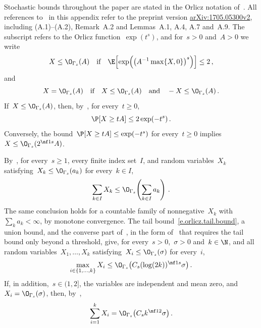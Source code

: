\documentclass[11pt]{amsart}
\begin{document}
Stochastic bounds throughout the paper are stated in the Orlicz notation of~\citet[Appendix~A]{AKMBook}. All references to~\citet[Appendix~A]{AKMBook} in this appendix refer to the preprint version \href{https://arxiv.org/abs/1705.05300v2}{arXiv:1705.05300v2}, including (A.1)--(A.2), Remark~A.2 and Lemmas~A.1, A.4, A.7 and~A.9. The subscript refers to the Orlicz function~$\exp(t^s)$, and for~$s>0$ and~$A>0$ we write
\begin{equation*}
	X\leq\O_{\Gamma_s}(A)
	\quad\text{if}\quad
	\E\!\left[\exp\!\left(\left(A^{-1}\max\{X,0\}\right)^s\right)\right]\leq2\,,
\end{equation*}
and
\begin{equation}
	X=\O_{\Gamma_s}(A)
	\quad\text{if}\quad
	X\leq\O_{\Gamma_s}(A)
	\quad\text{and}\quad
	-X\leq\O_{\Gamma_s}(A)\,.
	\label{e.orlicz.two.sided.definition}
\end{equation}
If~$X\leq\O_{\Gamma_s}(A)$, then, by~\citet[Lemma~A.1]{AKMBook}, for every~$t\geq0$,
\begin{equation}
	\P[X\geq tA]\leq2\exp(-t^s)\,.
	\label{e.orlicz.tail.bound}
\end{equation}
Conversely, the bound~$\P[X\geq tA]\leq\exp(-t^s)$ for every~$t\geq0$ implies~$X\leq\O_{\Gamma_s}(2^{\nf1s}A)$.

\smallskip

By~\citet[Lemma~A.4]{AKMBook}, for every~$s\geq1$, every finite index set~$I$, and random variables~$X_k$ satisfying~$X_k\leq\O_{\Gamma_s}(a_k)$ for every~$k\in I$,
\begin{equation}
	\sum_{k\in I}X_k
	\leq
	\O_{\Gamma_s}\!\left(\sum_{k\in I}a_k\right)\,.
	\label{e.orlicz.triangle.inequality}
\end{equation}
The same conclusion holds for a countable family of nonnegative~$X_k$ with~$\sum_k a_k<\infty$, by monotone convergence. The tail bound~\eqref{e.orlicz.tail.bound}, a union bound, and the converse part of~\citet[Lemma~A.1]{AKMBook}, in the form of~\citet[Remark~A.2]{AKMBook} that requires the tail bound only beyond a threshold, give, for every~$s>0$,~$\sigma>0$ and~$k\in\N$, and all random variables~$X_1,\ldots,X_k$ satisfying~$X_i\leq\O_{\Gamma_s}(\sigma)$ for every~$i$,
\begin{equation}
	\max_{i\in\{1,\ldots,k\}}X_i
	\leq
	\O_{\Gamma_s}\bigl(C_s(\log(2k))^{\nf1s}\sigma\bigr)\,.
	\label{e.max.scaling.O.Gamma.Two}
\end{equation}
If, in addition,~$s\in(1,2]$, the variables are independent and mean zero, and~$X_i=\O_{\Gamma_s}(\sigma)$, then, by~\citet[Lemmas~A.7 and~A.9]{AKMBook},
\begin{equation}
	\sum_{i=1}^k X_i
	=\O_{\Gamma_s}\bigl(C_s k^{\nf12}\sigma\bigr)\,.
	\label{e.CLT.scaling.O.Gamma.Two}
\end{equation}
\end{document}
